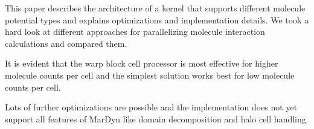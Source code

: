 This paper describes the architecture of a \cuda{} kernel that supports different molecule potential types and explains optimizations and implementation details.
We took a hard look at different approaches for parallelizing molecule interaction calculations and compared them.

It is evident that the warp block cell processor is most effective for higher molecule counts per cell and the simplest solution works best for low molecule counts per cell.

Lots of further optimizations are possible and the \cuda{} implementation does not yet support all features of MarDyn like domain decomposition and halo cell handling.